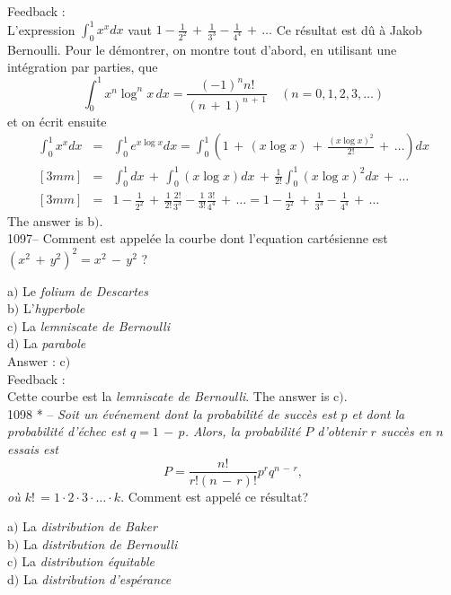 \documentclass[letterpaper, 12pt]{article}
\begin{document}
Feedback : \\
L'expression $\int_0^1x^xdx$ vaut
$1-\frac1{2^2}\,+\,\frac1{3^3}-\frac1{4^4}\,+\,\ldots$ Ce r\'esultat
est d\^u \`a Jakob Bernoulli. Pour le d\'emontrer, on montre tout
d'abord, en utilisant une int\'egration par parties, que
$$\displaystyle{\int_0^1x^n\log^nx\,dx=\frac{(-1)^nn!}{(n\,+\,1)^{n\,+\,1}}\quad(n=0,1,2,3,\ldots)}$$
et on \'ecrit ensuite
\begin{eqnarray*}
\int_0^1x^xdx & = & \displaystyle{\int_0^1e^{x\log
x}dx=\int_0^1\left(1\,+\,(x\log x)\,+\,\frac{(x\log
x)^2}{2!}\,+\,\ldots\right)dx} \\ [3mm]
              & = & \displaystyle{\int_0^1dx\,+\,\int_0^1(x\log
x)dx\,+\,\frac1{2!}\int_0^1(x\log x)^2dx\,+\,\ldots} \\ [3mm]
              & = &
\displaystyle{1-\frac1{2^2}\,+\,\frac1{2!}\frac{2!}{3^3}-\frac1{3!}\frac{3!}{4^4}\,+\,\ldots=1-\frac1{2^2}\,+\,\frac1{3^3}-\frac1{4^4}\,+\,\ldots}
\end{eqnarray*}
The answer is b$)$.\\

1097-- Comment est appel\'ee la courbe dont l'equation
cart\'esienne est $(x^2\,+\,y^2)^2=x^2\,-\,y^2$ ?

a$)$ Le {\sl folium de Descartes} \\
b$)$ L'{\sl hyperbole}  \\
c$)$ La {\sl lemniscate de Bernoulli}  \\
d$)$ La {\sl parabole}\\

Answer : c$)$\\

Feedback : \\
Cette courbe est la {\sl lemniscate de Bernoulli}.
The answer is c$)$.\\

1098 * -- {\sl Soit un \'ev\'enement dont la probabilit\'e de
succ\`es est $p$ et dont la probabilit\'e d'\'echec est $q=1\,-\,p$.
Alors, la probabilit\'e $P$ d'obtenir $r$ succ\`es en $n$ essais est
$$\displaystyle{P=\frac{n!}{r!(n\,-\,r)!}p^rq^{n\,-\,r}},$$
o\`u $k!\,=1\cdot2\cdot3\cdot\ldots\cdot k$}. Comment est appel\'e
ce r\'esultat?

a$)$ La {\sl distribution de Baker} \\
b$)$ La {\sl distribution de Bernoulli}   \\
c$)$ La {\sl distribution \'equitable}  \\
d$)$ La {\sl distribution d'esp\'erance}\\
\end{document}
